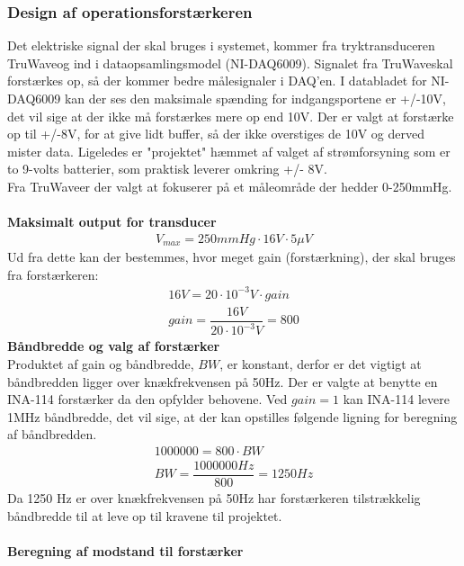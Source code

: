 \subsubsection{Design af operationsforstærkeren}
Det elektriske signal der skal bruges i systemet, kommer fra tryktransduceren TruWave\texttrademark og ind i dataopsamlingsmodel (NI-DAQ6009). Signalet fra TruWave\texttrademark skal forstærkes op, så der kommer bedre målesignaler i DAQ’en. I databladet for NI-DAQ6009 kan der ses den maksimale spænding for indgangsportene er +/-10V, det vil sige at der ikke må forstærkes mere op end 10V. Der er valgt at forstærke op til +/-8V, for at give lidt buffer, så der ikke overstiges de 10V og derved mister data. Ligeledes er "projektet" hæmmet af valget af strømforsyning som er to 9-volts batterier, som praktisk leverer omkring +/- 8V.\\ 
Fra TruWave\texttrademark er der valgt at fokuserer på et måleområde der hedder 0-250mmHg. \\\\
\textbf{Maksimalt output for transducer}\\
\begin{align}
V_{max}=250mmHg\cdot 16V\cdot 5\mu V 
\end{align}
Ud fra dette kan der bestemmes, hvor meget gain (forstærkning), der skal bruges fra forstærkeren:
\begin{align}
16V = 20\cdot 10^{-3}V\cdot gain\\
gain = \dfrac{16V}{20\cdot 10^{-3}V}=800
\end{align}
\textbf{Båndbredde og valg af forstærker}\\
Produktet af gain og båndbredde, $BW$, er konstant, derfor er det vigtigt at båndbredden ligger over knækfrekvensen på 50Hz. Der er valgte at benytte en INA-114 forstærker da den opfylder behovene. Ved $gain=1$ kan INA-114 levere 1MHz båndbredde, det vil sige, at der kan opstilles følgende ligning for beregning af båndbredden.
\begin{align}
1000000 = 800\cdot BW\\
BW = \dfrac{1000000Hz}{800}=1250Hz
\end{align}
Da 1250 Hz er over knækfrekvensen på 50Hz har forstærkeren tilstrækkelig båndbredde til at leve op til kravene til projektet.\\\\
\textbf{Beregning af modstand til forstærker}\\
